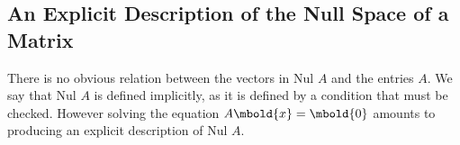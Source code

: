 \documentclass[12pt letter]{report}
\begin{document}
\subsection{An Explicit Description of the Null Space of a Matrix}

There is no obvious relation between the vectors in $\text{Nul } A$ and the entries $A$. We say that $\text{Nul } A$ is
defined implicitly, as it is defined by a condition that must be checked. However solving the equation $A \mbold{x} =
  \mbold{0}$ amounts to producing an explicit description of $\text{Nul } A$.

\end{document}
